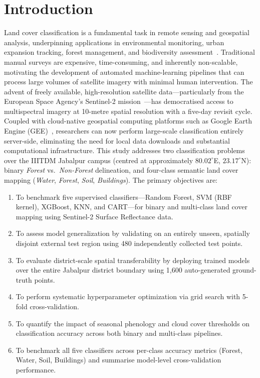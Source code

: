 \documentclass[12pt, a4paper, twocolumn]{article}
\begin{document}
\section{Introduction}
\label{sec:introduction}

Land cover classification is a fundamental task in remote sensing and geospatial analysis, underpinning applications in environmental monitoring, urban expansion tracking, forest management, and biodiversity assessment~\cite{lu2007survey}.
Traditional manual surveys are expensive, time-consuming, and inherently non-scalable, motivating the development of automated machine-learning pipelines that can process large volumes of satellite imagery with minimal human intervention.
The advent of freely available, high-resolution satellite data---particularly from the European Space Agency's Sentinel-2 mission~\cite{drusch2012sentinel}---has democratised access to multispectral imagery at 10-metre spatial resolution with a five-day revisit cycle.
Coupled with cloud-native geospatial computing platforms such as Google Earth Engine (GEE)~\cite{gorelick2017google}, researchers can now perform large-scale classification entirely server-side, eliminating the need for local data downloads and substantial computational infrastructure.
This study addresses two classification problems over the IIITDM Jabalpur campus (centred at approximately $80.02^{\circ}$E, $23.17^{\circ}$N): binary \textit{Forest} vs.\ \textit{Non-Forest} delineation, and four-class semantic land cover mapping (\textit{Water}, \textit{Forest}, \textit{Soil}, \textit{Buildings}).
The primary objectives are:

\begin{enumerate}[label=(\roman*)]
    \item To benchmark five supervised classifiers---Random Forest, SVM (RBF kernel), XGBoost, KNN, and CART---for binary and multi-class land cover mapping using Sentinel-2 Surface Reflectance data.
    \item To assess model generalization by validating on an entirely unseen, spatially disjoint external test region using 480 independently collected test points.
    \item To evaluate district-scale spatial transferability by deploying trained models over the entire Jabalpur district boundary using 1,600 auto-generated ground-truth points.
    \item To perform systematic hyperparameter optimization via grid search with 5-fold cross-validation.
    \item To quantify the impact of seasonal phenology and cloud cover thresholds on classification accuracy across both binary and multi-class pipelines.
    \item To benchmark all five classifiers across per-class accuracy metrics (Forest, Water, Soil, Buildings) and summarise model-level cross-validation performance.
\end{enumerate}
\end{document}
